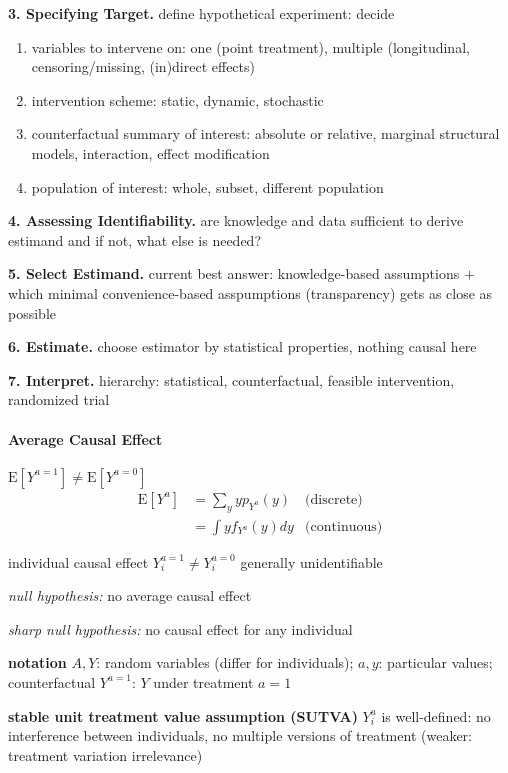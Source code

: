 \documentclass[8pt,twoside]{extarticle}
\begin{document}
\begin{multicols}{2}
 \textbf{3. Specifying Target.} define hypothetical experiment: decide
\begin{enumerate}[itemsep=0em, topsep=0pt, partopsep=0pt,parsep=0pt]
\setlength{\itemsep}{0pt}%
\setlength{\parskip}{0pt}
\item variables to intervene on: one (point treatment), multiple (longitudinal, censoring/missing, (in)direct effects)
\item intervention scheme: static, dynamic, stochastic
\item counterfactual summary of interest: absolute or relative, marginal structural models, interaction, effect modification
\item population of interest: whole, subset, different population
\end{enumerate}

 \textbf{4. Assessing Identifiability.} are knowledge and data sufficient to derive estimand and if not, what else is needed?

 \textbf{5. Select Estimand.} current best answer: knowledge-based assumptions $+$ which minimal convenience-based asspumptions (transparency) gets as close as possible

 \textbf{6. Estimate.} choose estimator by statistical properties, nothing causal here

 \textbf{7. Interpret.} hierarchy: statistical, counterfactual, feasible intervention, randomized trial


\paragraph{Average Causal Effect} $\mathrm{E}\left[Y^{a=1}\right] \neq \mathrm{E}\left[Y^{a=0}\right]$
\begin{align*}
\mathrm{E}\left[Y^{a}\right]   &=  \sum_yyp_{Y^a}(y)  &\text{(discrete)}\\[-0.5em]
   &=  \int yf_{Y^a}(y)dy &\text{(continuous)}
\end{align*}

 individual causal effect $Y_i^{a=1} \neq Y_i^{a=0}$ generally unidentifiable

 \textit{null hypothesis:} no average causal effect

 \textit{sharp null hypothesis:} no causal effect for any individual

 \textbf{notation} $A,Y$: random variables (differ for individuals);
$a,y$: particular values; counterfactual $Y^{a=1}$: $Y$ under treatment $a=1$

  \textbf{stable unit treatment value assumption (SUTVA)} $Y_i^a$ is well-defined: no interference between individuals, no multiple versions of treatment (weaker: treatment variation irrelevance)


\end{multicols}
\end{document}
